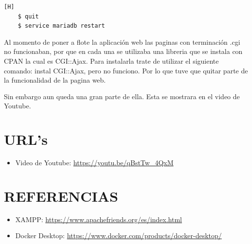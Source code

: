 \begin{lstlisting}[language=bash,caption={Reiniciando el servicio}][H]
    $ quit
    $ service mariadb restart
\end{lstlisting}

Al momento de poner a flote la aplicación web las paginas con terminación .cgi no funcionaban, por que en cada una se utilizaba una libreria que se instala con CPAN la cual es CGI::Ajax. Para instalarla trate de utilizar el siguiente comando: instal CGI::Ajax, pero no funciono. Por lo que tuve que quitar parte de la funcionalidad de la pagina web. 

Sin embargo aun queda una gran parte de ella. Esta se mostrara en el video de Youtube.

\section{URL's}
\begin{itemize}
    \item Video de Youtube: \url{https://youtu.be/qBstTw_4QxM}
\end{itemize}

\section*{REFERENCIAS}
\begin{itemize}
    \item XAMPP: \url{https://www.apachefriends.org/es/index.html}
    \item Docker Desktop: \url{https://www.docker.com/products/docker-desktop/}
\end{itemize}

